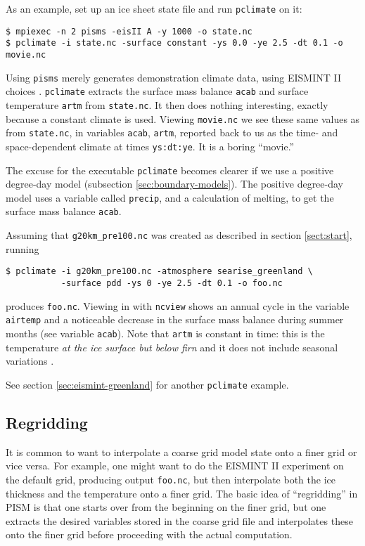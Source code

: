 \bigskip
As an example, set up an ice sheet state file and run \texttt{pclimate} on it:
\begin{verbatim}
$ mpiexec -n 2 pisms -eisII A -y 1000 -o state.nc
$ pclimate -i state.nc -surface constant -ys 0.0 -ye 2.5 -dt 0.1 -o movie.nc
\end{verbatim}
Using \texttt{pisms} merely generates demonstration climate data, using
EISMINT II choices \cite{EISMINT00}.  \texttt{pclimate} extracts the 
surface mass balance \texttt{acab} and surface temperature \texttt{artm} from \texttt{state.nc}.
It then does nothing interesting, exactly because a constant climate
is used.  Viewing \texttt{movie.nc} we see these same values as from \texttt{state.nc},
in variables \texttt{acab}, \texttt{artm}, reported back to us as the time- and space-dependent
climate at times \texttt{ys:dt:ye}.  It is a boring ``movie.''

The excuse for the executable \texttt{pclimate} becomes clearer if we use a positive degree-day
model (subsection \ref{sec:boundary-models}).  The positive degree-day
model uses a variable called \texttt{precip}, and a calculation of melting, to get the
surface mass balance \texttt{acab}. 

Assuming that \texttt{g20km_pre100.nc} was created as described in section
\ref{sect:start}, running
\begin{verbatim}
$ pclimate -i g20km_pre100.nc -atmosphere searise_greenland \
           -surface pdd -ys 0 -ye 2.5 -dt 0.1 -o foo.nc
\end{verbatim}%
produces \texttt{foo.nc}. Viewing in with \texttt{ncview} shows an annual cycle
in the variable \texttt{airtemp} and a noticeable decrease in the surface mass
balance during summer months (see variable \texttt{acab}). Note that
\texttt{artm} is constant in time: this is the temperature \emph{at the ice
  surface but below firn} and it does not include seasonal variations \cite{Hock05}.

See section \ref{sec:eismint-greenland} for another \texttt{pclimate} example.

\subsection{Regridding}
\label{sec:regridding}

It is common to want to interpolate a coarse grid model state onto a finer grid or vice versa.  For example, one might want to do the EISMINT II experiment on the default grid, producing output \texttt{foo.nc}, but then interpolate both the ice thickness and the temperature onto a finer grid.  The basic idea of ``regridding'' in PISM is that one starts over from the beginning on the finer grid, but one extracts the desired variables stored in the coarse grid file and interpolates these onto the finer grid before proceeding with the actual computation.

